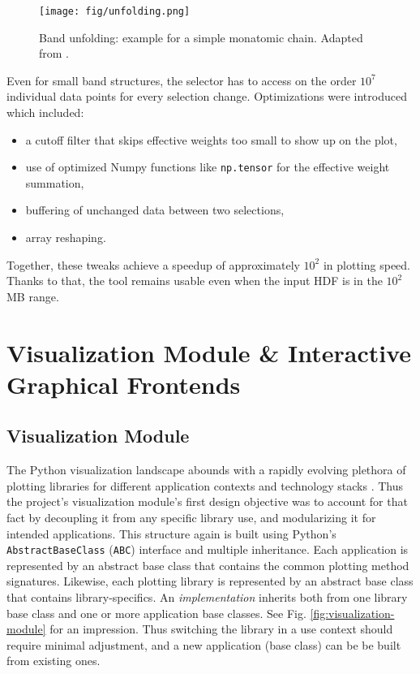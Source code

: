 \begin{figure}[htb!]
    \centering
    \texttt{[image: fig/unfolding.png]}
    \caption[Band Unfolding]{Band unfolding: example for a simple monatomic
      chain. Adapted from \cite{hoffmann1987chemistry}.}
    \label{fig:unfolding}
\end{figure}

Even for small band structures, the selector has to access on the order \(10^7\)
individual data points for every selection change. Optimizations were introduced
which included:
\begin{itemize}
\item a cutoff filter that skips effective weights too small to show up on the
    plot,
\item use of optimized Numpy functions like \texttt{np.tensor} for the
    effective weight summation,
\item buffering of unchanged data between two selections,
\item array reshaping.
\end{itemize}

Together, these tweaks achieve a speedup of approximately \(10^2\) in plotting
speed. Thanks to that, the tool remains usable even when the input HDF is in the
\(10^2\) MB range.

\section{Visualization Module \& Interactive Graphical Frontends}
\label{sec:visualization-module}

\subsection{Visualization Module}
\label{sec:visualization-interface}

The Python visualization landscape abounds with a rapidly evolving plethora of
plotting libraries for different application contexts and technology stacks
\cite{python-viz-landscape}. Thus the project's visualization module's first
design objective was to account for that fact by decoupling it from any specific library
use, and modularizing it for intended applications. This structure again is built using Python's
\texttt{AbstractBaseClass} (\texttt{ABC}) interface and multiple inheritance.
Each application is represented by an abstract base class that contains the
common plotting method signatures. Likewise, each plotting library is represented by an
abstract base class that contains library-specifics. An \emph{implementation} inherits
both from one library base class and one or more application base classes. See
Fig. \ref{fig:visualization-module} for an impression. Thus switching the
library in a use context should require minimal adjustment, and a new
application (base class) can be be built from existing ones.

